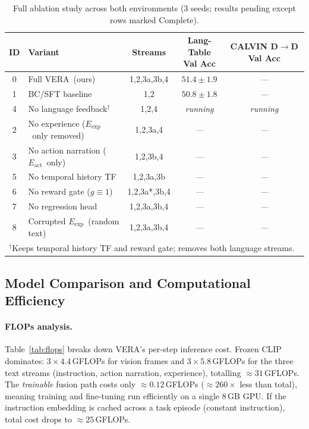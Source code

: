\documentclass{article}
\newcommand{\modelname}{\textsc{VERA}\xspace}
\newcommand{\Lact}{$E_{\mathrm{act}}$\xspace}
\newcommand{\Lexp}{$E_{\mathrm{exp}}$\xspace}
\newcommand{\tbd}{\textit{---}\xspace}
\begin{document}
\begin{table}[h]
\centering
\caption{Full ablation study across both environments (3 seeds; results pending except rows marked Complete).}
\label{tab:ablations}
\small
\setlength{\tabcolsep}{4pt}
\begin{tabular}{clccc}
\toprule
\textbf{ID} & \textbf{Variant} & \textbf{Streams}
            & \makecell{Lang-Table\\Val Acc}
            & \makecell{CALVIN D$\to$D\\Val Acc} \\
\midrule
0  & Full \modelname\ (ours)              & 1,2,3a,3b,4  & $\mathbf{51.4\pm1.9}$ & \tbd \\
1  & BC/SFT baseline                      & 1,2          & $50.8\pm1.8$          & \tbd \\
4  & No language feedback$^\dagger$       & 1,2,4        & \textit{running}      & \textit{running} \\
2  & No experience (\Lexp\ only removed)  & 1,2,3a,4     & \tbd                  & \tbd \\
3  & No action narration (\Lact\ only)    & 1,2,3b,4     & \tbd                  & \tbd \\
5  & No temporal history TF               & 1,2,3a,3b    & \tbd                  & \tbd \\
6  & No reward gate ($g\!\equiv\!1$)      & 1,2,3a*,3b,4 & \tbd                  & \tbd \\
7  & No regression head                   & 1,2,3a,3b,4  & \tbd                  & \tbd \\
8  & Corrupted \Lexp\ (random text)       & 1,2,3a,3b,4  & \tbd                  & \tbd \\
\bottomrule
\multicolumn{5}{l}{\footnotesize $^\dagger$Keeps temporal history TF and reward gate; removes both language streams.}\\
\end{tabular}
\end{table}

\subsection{Model Comparison and Computational Efficiency}
\label{sec:comparison}

\paragraph{FLOPs analysis.}
Table~\ref{tab:flops} breaks down VERA's per-step inference cost.
Frozen CLIP dominates: $3 \times 4.4$\,GFLOPs for vision frames
and $3 \times 5.8$\,GFLOPs for the three text streams
(instruction, action narration, experience), totalling $\approx\!31$\,GFLOPs.
The \emph{trainable} fusion path costs only $\approx\!0.12$\,GFLOPs
(${\approx}260\times$ less than total), meaning training
and fine-tuning run efficiently on a single 8\,GB GPU.
If the instruction embedding is cached across a task episode (constant instruction),
total cost drops to $\approx\!25$\,GFLOPs.
\end{document}
